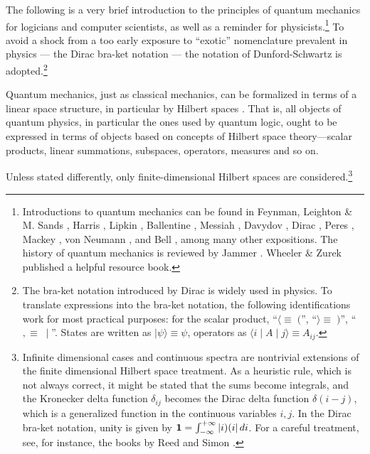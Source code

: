 \documentclass [11pt]{llncs}
\begin{document}
The following is a very brief introduction to the principles of quantum
mechanics
for logicians and computer scientists, as well as a reminder for
physicists.\footnote{ Introductions to quantum mechanics can be found in
Feynman, Leighton \& M. Sands \cite{feynman-III},
Harris \cite{har},
Lipkin \cite{lipkin},
Ballentine  \cite{ba-89},
Messiah  \cite{messiah-61},
Davydov \cite{davydov},
Dirac \cite{dirac},
Peres \cite{peres},
Mackey \cite{mackey:63},
von Neumann \cite{v-neumann-49}, and
Bell \cite{bell-87}, among many other expositions.
The history of quantum mechanics is reviewed by
Jammer \cite{jammer1}.
Wheeler \& Zurek \cite{wheeler-Zurek:83} published a helpful resource
book.}
To avoid a shock from a too early exposure  to ``exotic''
nomenclature prevalent in physics --- the Dirac bra-ket notation --- the
notation of Dunford-Schwartz
\cite{dunford-schwartz} is adopted.\footnote{
The bra-ket
notation introduced by Dirac is widely used in physics. To
translate expressions into the bra-ket notation, the following
identifications work for most practical purposes: for the scalar
product,
``$\langle  \equiv \;($'',
``$\rangle  \equiv \; )$'',
``$, \equiv \; \mid $''.
States are written as
$\mid  \psi \rangle  \equiv \psi$, operators as
$\langle  i\mid  A\mid  j \rangle  \equiv A_{ij}$.}

Quantum mechanics, just as classical mechanics, can be formalized in
terms of a linear space structure, in particular by Hilbert spaces
\cite{v-neumann-49}.
That is, all objects of quantum physics, in
particular the ones used by quantum logic, ought to be expressed
in terms of objects based on concepts of Hilbert space theory---scalar
products, linear summations, subspaces, operators, measures and so on.

Unless stated differently, only
finite-dimensional Hilbert spaces are considered.\footnote{
Infinite dimensional cases and continuous spectra are nontrivial
extensions of the finite
dimensional Hilbert space treatment. As a heuristic rule, which is not
always correct, it might be
stated that the sums become integrals, and the Kronecker delta function
$\delta_{ij}$
becomes the Dirac delta function $\delta (i-j)$, which is a
generalized function in the continuous variables $i,j$.
In the Dirac bra-ket notation, unity is given by
${\bf 1}=\int_{-\infty}^{+\infty} \vert i)( i\vert \, di$.
For a careful treatment, see, for instance,
the books by
Reed and Simon \cite{reed-sim1,reed-sim2}.}
\end{document}
